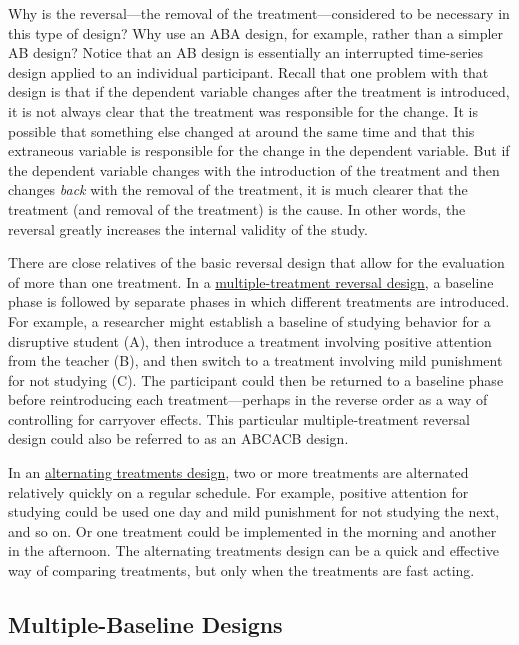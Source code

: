 \documentclass[
]{krantz}
\begin{document}
Why is the reversal---the removal of the treatment---considered to be necessary in this type of design? Why use an ABA design, for example, rather than a simpler AB design? Notice that an AB design is essentially an interrupted time-series design applied to an individual participant. Recall that one problem with that design is that if the dependent variable changes after the treatment is introduced, it is not always clear that the treatment was responsible for the change. It is possible that something else changed at around the same time and that this extraneous variable is responsible for the change in the dependent variable. But if the dependent variable changes with the introduction of the treatment and then changes \emph{back} with the removal of the treatment, it is much clearer that the treatment (and removal of the treatment) is the cause. In other words, the reversal greatly increases the internal validity of the study.

There are close relatives of the basic reversal design that allow for the evaluation of more than one treatment. In a \protect\hyperlink{multiple-treatment-reversal-design}{multiple-treatment reversal design}, a baseline phase is followed by separate phases in which different treatments are introduced. For example, a researcher might establish a baseline of studying behavior for a disruptive student (A), then introduce a treatment involving positive attention from the teacher (B), and then switch to a treatment involving mild punishment for not studying (C). The participant could then be returned to a baseline phase before reintroducing each treatment---perhaps in the reverse order as a way of controlling for carryover effects. This particular multiple-treatment reversal design could also be referred to as an ABCACB design.

In an \protect\hyperlink{alternating-treatments-design}{alternating treatments design}, two or more treatments are alternated relatively quickly on a regular schedule. For example, positive attention for studying could be used one day and mild punishment for not studying the next, and so on. Or one treatment could be implemented in the morning and another in the afternoon. The alternating treatments design can be a quick and effective way of comparing treatments, but only when the treatments are fast acting.

\hypertarget{multiple-baseline-designs}{%
\subsection*{Multiple-Baseline Designs}\label{multiple-baseline-designs}}
\end{document}
